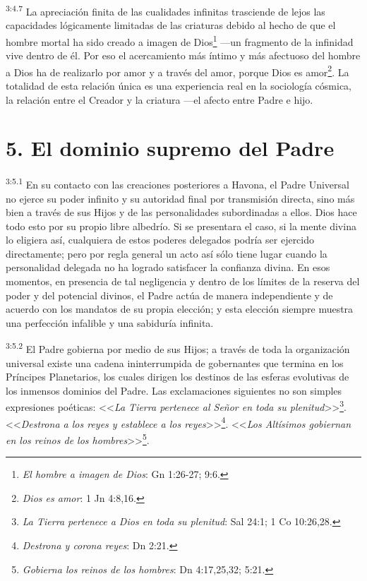 \par
\textsuperscript{3:4.7} La apreciación finita de las cualidades infinitas trasciende de lejos las capacidades lógicamente limitadas de las criaturas debido al hecho de que el hombre mortal ha sido creado a imagen de Dios\footnote{\textit{El hombre a imagen de Dios}: Gn 1:26-27; 9:6.} ---un fragmento de la infinidad vive dentro de él. Por eso el acercamiento más íntimo y más afectuoso del hombre a Dios ha de realizarlo por amor y a través del amor, porque Dios es amor\footnote{\textit{Dios es amor}: 1 Jn 4:8,16.}. La totalidad de esta relación única es una experiencia real en la sociología cósmica, la relación entre el Creador y la criatura ---el afecto entre Padre e hijo.

\section*{5. El dominio supremo del Padre}
\par
\textsuperscript{3:5.1} En su contacto con las creaciones posteriores a Havona, el Padre Universal no ejerce su poder infinito y su autoridad final por transmisión directa, sino más bien a través de sus Hijos y de las personalidades subordinadas a ellos. Dios hace todo esto por su propio libre albedrío. Si se presentara el caso, si la mente divina lo eligiera así, cualquiera de estos poderes delegados podría ser ejercido directamente; pero por regla general un acto así sólo tiene lugar cuando la personalidad delegada no ha logrado satisfacer la confianza divina. En esos momentos, en presencia de tal negligencia y dentro de los límites de la reserva del poder y del potencial divinos, el Padre actúa de manera independiente y de acuerdo con los mandatos de su propia elección; y esta elección siempre muestra una perfección infalible y una sabiduría infinita.

\par
\textsuperscript{3:5.2} El Padre gobierna por medio de sus Hijos; a través de toda la organización universal existe una cadena ininterrumpida de gobernantes que termina en los Príncipes Planetarios, los cuales dirigen los destinos de las esferas evolutivas de los inmensos dominios del Padre. Las exclamaciones siguientes no son simples expresiones poéticas: <<\textit{La Tierra pertenece al Señor en toda su plenitud}>>\footnote{\textit{La Tierra pertenece a Dios en toda su plenitud}: Sal 24:1; 1 Co 10:26,28.}. <<\textit{Destrona a los reyes y establece a los reyes}>>\footnote{\textit{Destrona y corona reyes}: Dn 2:21.}. <<\textit{Los Altísimos gobiernan en los reinos de los hombres}>>\footnote{\textit{Gobierna los reinos de los hombres}: Dn 4:17,25,32; 5:21.}.

